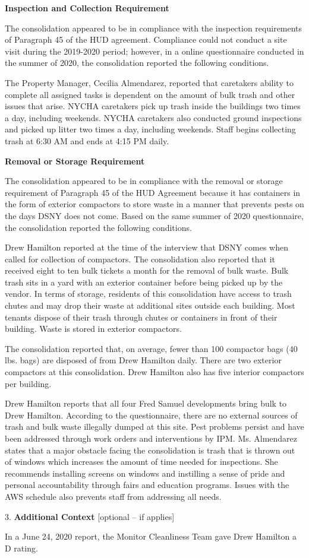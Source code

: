 
\textbf{Inspection and Collection Requirement}

The consolidation appeared to be in compliance with the inspection requirements of Paragraph 45 of the HUD agreement. Compliance could not conduct a site visit during the 2019-2020 period; however, in a online questionnaire conducted in the summer of 2020, the consolidation reported the following conditions.

The Property Manager, Cecilia Almendarez, reported that caretakers ability to complete all assigned tasks is dependent on the amount of bulk trash and other issues that arise. NYCHA caretakers pick up trash inside the buildings two times a day, including weekends. NYCHA caretakers also conducted ground inspections and picked up litter two times a day, including weekends. Staff begins collecting trash at 6:30 AM and ends at 4:15 PM daily. 

\textbf{Removal or Storage Requirement}

The consolidation appeared to be in compliance with the  removal or storage requirement of Paragraph  45 of the HUD Agreement because it has containers in the form of exterior compactors to store waste in a manner that prevents pests on the days DSNY does not come. Based on the same summer of  2020 questionnaire, the consolidation reported the following conditions.

Drew Hamilton reported at the time of the interview that DSNY comes when called for collection of compactors. The consolidation also reported that it received eight to ten bulk tickets a month for the removal of bulk waste. Bulk trash sits in a yard with an exterior container before being picked up by the vendor. In terms of storage, residents of this consolidation have access to trash chutes and may drop their waste at additional sites outside each building. Most tenants dispose of their trash through chutes or containers in front of their building. Waste is stored in exterior compactors. 

The consolidation reported that, on average, fewer than 100 compactor bags (40 lbs. bags) are disposed of from Drew Hamilton daily. There are two exterior compactors at this consolidation. Drew Hamilton also has five interior compactors per building.

Drew Hamilton reports that all four Fred Samuel developments bring bulk to Drew Hamilton. According to the questionnaire, there are no external sources of trash and bulk waste illegally dumped at this site. Pest problems persist and have been addressed through work orders and interventions by IPM. Ms. Almendarez states that a major obstacle facing the consolidation is trash that is thrown out of windows which increases the amount of time needed  for inspections. She recommends installing screens on windows and instilling a sense of pride and personal accountability through fairs and education programs. Issues with the AWS schedule also prevents staff from addressing all needs. 

3. \textbf{Additional Context} [optional -- if applies]

In a June 24, 2020 report, the Monitor Cleanliness Team gave Drew Hamilton a D rating. 